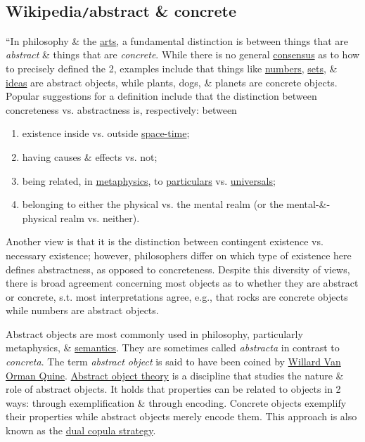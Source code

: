 \documentclass{article}
\begin{document}
\subsection{Wikipedia{\tt/}abstract \& concrete}
``In philosophy \& the \href{https://en.wikipedia.org/wiki/The_arts}{arts},  a fundamental distinction is between things that are {\it abstract} \& things that are {\it concrete}. While there is no general \href{https://en.wikipedia.org/wiki/Consensus_decision-making}{consensus} as to how to precisely defined the 2, examples include that things like \href{https://en.wikipedia.org/wiki/Number}{numbers}, \href{https://en.wikipedia.org/wiki/Set_(mathematics)}{sets}, \& \href{https://en.wikipedia.org/wiki/Idea}{ideas} are abstract objects, while plants, dogs, \& planets are concrete objects. Popular suggestions for a definition include that the distinction between concreteness vs. abstractness is, respectively: between
\begin{enumerate}
	\item existence inside vs. outside \href{https://en.wikipedia.org/wiki/Spacetime}{space-time};
	\item having causes \& effects vs. not;
	\item being related, in \href{https://en.wikipedia.org/wiki/Metaphysics}{metaphysics}, to \href{https://en.wikipedia.org/wiki/Particulars}{particulars} vs. \href{https://en.wikipedia.org/wiki/Universal_(metaphysics)}{universals};
	\item belonging to either the physical vs. the mental realm (or the mental-\&-physical realm vs. neither).
\end{enumerate}
Another view is that it is the distinction between contingent existence vs. necessary existence; however, philosophers differ on which type of existence here defines abstractness, as opposed to concreteness. Despite this diversity of views, there is broad agreement concerning most objects as to whether they are abstract or concrete, s.t. most interpretations agree, e.g., that rocks are concrete objects while numbers are abstract objects.

Abstract objects are most commonly used in philosophy, particularly metaphysics, \& \href{https://en.wikipedia.org/wiki/Semantics}{semantics}. They are sometimes called {\it abstracta} in contrast to {\it concreta}. The term {\it abstract object} is said to have been coined by \href{https://en.wikipedia.org/wiki/Willard_Van_Orman_Quine}{\sc Willard Van Orman Quine}. \href{https://en.wikipedia.org/wiki/Abstract_object_theory}{Abstract object theory} is a discipline that studies the nature \& role of abstract objects. It holds that properties can be related to objects in 2 ways: through exemplification \& through encoding. Concrete objects exemplify their properties while abstract objects merely encode them. This approach is also known as the \href{https://en.wikipedia.org/wiki/Dual_copula_strategy}{dual copula strategy}.
\end{document}
